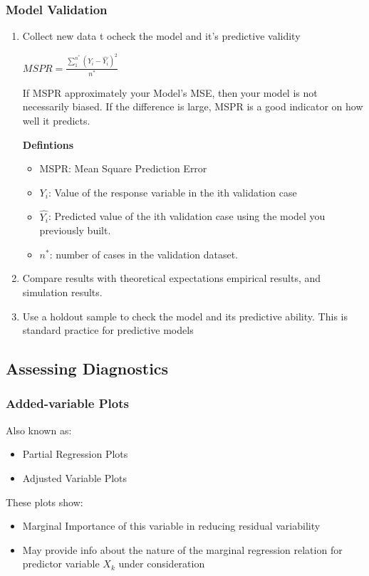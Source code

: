 \documentclass[11pt]{article}
\begin{document}
\subsubsection{Model Validation}
\label{sec:org96bdd75}
\begin{enumerate}
\item Collect new data t ocheck the model and it's predictive validity

\(MSPR = \frac{\sum_{1}^{n^*} (Y_i - \hat{Y_i})^2}{n^*}\)

If MSPR approximately your Model's MSE, then your model is not necessarily
biased.
If the difference is large, MSPR is a good indicator on how well it predicts.

\textbf{Defintions}
\begin{itemize}
\item MSPR: Mean Square Prediction Error
\item \(Y_i\): Value of the response variable in the ith validation case
\item \(\hat{Y_i}\): Predicted value of the ith validation case using the model you
previously built.
\item \(n^*\): number of cases in the validation dataset.
\end{itemize}

\item Compare results with theoretical expectations empirical results, and
simulation results.
\item Use a holdout sample to check the model and its predictive ability. This is
standard practice for predictive models
\end{enumerate}

\subsection{Assessing Diagnostics}
\label{sec:org58a14af}
\subsubsection{Added-variable Plots}
\label{sec:org2ee82bb}
Also known as:
\begin{itemize}
\item Partial Regression Plots
\item Adjusted Variable Plots
\end{itemize}

These plots show:
\begin{itemize}
\item Marginal Importance of this variable in reducing residual variability
\item May provide info about the nature of the marginal regression relation for
predictor variable \(X_k\) under consideration
\end{itemize}
\end{document}
